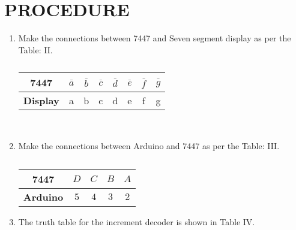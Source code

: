 \documentclass[conference]{IEEEtran}
\begin{document}
\section{PROCEDURE}
\begin {enumerate}
\item Make the connections between 7447 and Seven segment display as per the Table: II.
\begin{table}                       
\centering                          
\begin{tabular}{| c | c | c | c | c | c | c | c |} \hline                                
	\textbf{7447} & $\overline{a}$ & $\overline{b}$ & $ \overline{c}$ & $\overline{d}$ & $\overline{e}$ & $\overline{f}$  & $\overline{g}$ \\\hline 
\textbf{Display} & a & b & c & d & e & f & g \\ \hline                           
\end{tabular}             
\vspace{0.1cm}                                 
\caption{\label{tab:widgets}}                     
\end{table} \\
\item Make the connections between Arduino and 7447 as per the Table: III.

\begin{table} 
\centering
\begin{tabular}{| c | c | c | c | c |} \hline
\textbf{7447} & $D$ & $C$ & $B$ & $A$ \\\hline
\textbf{Arduino} & $5$ & $4$ & $3$ & $2$ \\ \hline 
\end{tabular}
\vspace{0.1cm}
\caption{\label{tab:widgets}}
\end{table}
\item The truth table for the increment decoder is shown in Table IV.


\end{enumerate}
\end{document}
